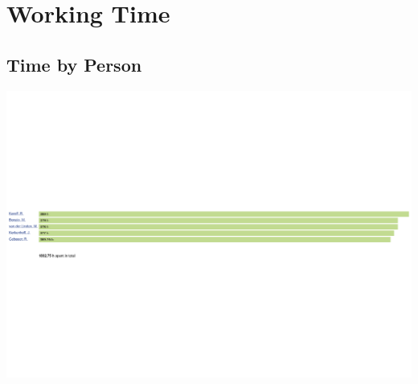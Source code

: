 \documentclass[12pt]{article}
\begin{document}
	\section{Working Time}
		\subsection{Time by Person}
			\hspace*{0.20\paperheight}
			\includegraphics[width=1.2\textwidth,angle=90]{timebyperson}
		\clearpage

	
\end{document}
